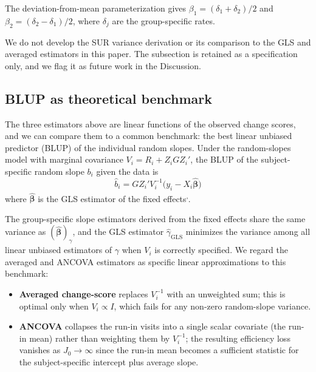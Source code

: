 \documentclass[
  11pt,
]{article}
\providecommand{\tightlist}{%
  \setlength{\itemsep}{0pt}\setlength{\parskip}{0pt}}
\begin{document}
The deviation-from-mean parameterization gives
\(\beta_1 = (\delta_1 + \delta_2)/2\) and
\(\beta_2 = (\delta_2 - \delta_1)/2\), where
\(\delta_j\) are the group-specific rates.

We do not develop the SUR variance derivation or its
comparison to the GLS and averaged estimators in this
paper. The subsection is retained as a specification
only, and we flag it as future work in the Discussion.

\subsection{BLUP as theoretical benchmark}\label{blup-as-theoretical-benchmark}

The three estimators above are linear functions of the
observed change scores, and we can compare them to a
common benchmark: the best linear unbiased predictor
(BLUP) of the individual random slopes. Under the
random-slopes model with marginal covariance
\(V_i = R_i + Z_i G Z_i'\), the BLUP of the
subject-specific random slope \(b_i\) given the data is
\begin{equation}
  \hat b_i
  = G Z_i' V_i^{-1}
    \bigl(y_i - X_i \hat{\boldsymbol{\beta}}\bigr)
  \label{eq:blup}
\end{equation}
where \(\hat{\boldsymbol{\beta}}\) is the GLS estimator of the
fixed effects\textsuperscript{,}.

The group-specific slope estimators derived from the fixed
effects share the same variance as
\((\hat{\boldsymbol{\beta}})_\gamma\), and the GLS estimator
\(\hat\gamma_{\text{GLS}}\) minimizes the variance among all
linear unbiased estimators of \(\gamma\) when \(V_i\) is
correctly specified. We regard the averaged and ANCOVA
estimators as specific linear approximations to this
benchmark:

\begin{itemize}
\tightlist
\item
  \textbf{Averaged change-score} replaces \(V_i^{-1}\) with an
  unweighted sum; this is optimal only when \(V_i \propto I\),
  which fails for any non-zero random-slope variance.
\item
  \textbf{ANCOVA} collapses the run-in visits into a single
  scalar covariate (the run-in mean) rather than weighting
  them by \(V_i^{-1}\); the resulting efficiency loss vanishes
  as \(J_0 \to \infty\) since the run-in mean becomes a
  sufficient statistic for the subject-specific intercept
  plus average slope.
\end{itemize}
\end{document}
